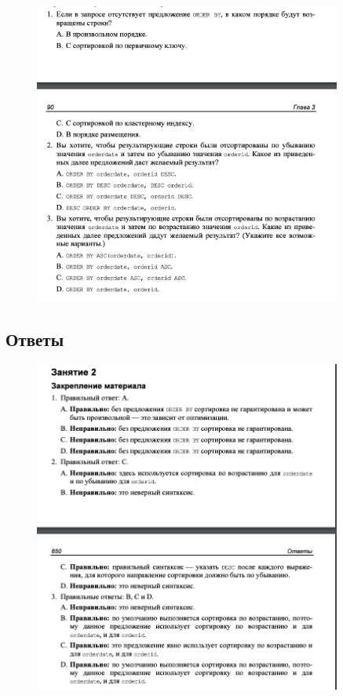 \begin{figure}[h!]
	\begin{center}
		\includegraphics[width=0.9\textwidth]{img/zakrep6.png}
	\end{center}
	\captionsetup{justification=centering}
\end{figure}
\clearpage

\subsection*{Ответы}

\begin{figure}[h!]
	\begin{center}
		\includegraphics[width=0.9\textwidth]{img/ans6.png}
	\end{center}
	\captionsetup{justification=centering}
\end{figure}



